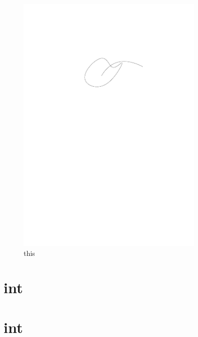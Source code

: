 \documentclass[12pt,oneside]{report}
\begin{document}
\begin{figure}[ht]
    \centering
 \includegraphics[width=0.8\textwidth]{./figures/this.pdf}
    \caption{this}
    \label{fig:this}
\end{figure}



\section{int}




\section{int}

\end{document}
